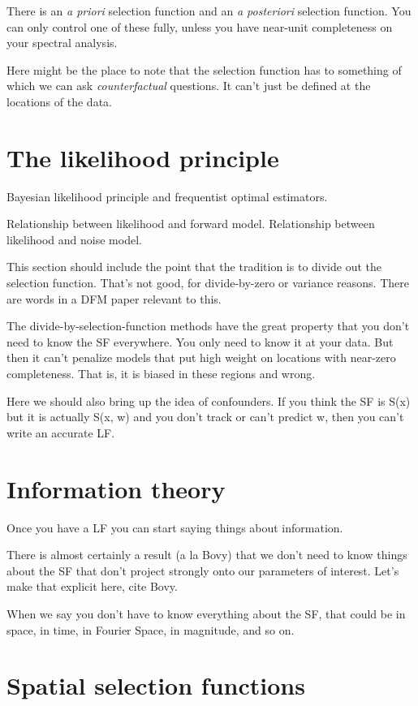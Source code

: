 \documentclass[modern]{aastex62}
\newcommand{\foreign}[1]{\textsl{#1}}
\begin{document}
There is an \foreign{a priori} selection function and an \foreign{a posteriori}
selection function. You can only control one of these fully, unless you have near-unit
completeness on your spectral analysis.

Here might be the place to note that the selection function has to something of
which we can ask \emph{counterfactual} questions. It can't just be defined at
the locations of the data.

\section{The likelihood principle}

Bayesian likelihood principle and frequentist optimal estimators.

Relationship between likelihood and forward model. Relationship between
likelihood and noise model.

This section should include the point that the tradition is to divide out
the selection function. That's not good, for divide-by-zero or variance
reasons. There are words in a DFM paper relevant to this.

The divide-by-selection-function methods have the great property that you don't need
to know the SF everywhere. You only need to know it at your data. But then
it can't penalize models that put high weight on locations with near-zero
completeness. That is, it is biased in these regions and wrong.

Here we should also bring up the idea of confounders. If you think the SF
is S(x) but it is actually S(x, w) and you don't track or can't predict w,
then you can't write an accurate LF.

\section{Information theory}

Once you have a LF you can start saying things about information.

There is almost certainly a result (a la Bovy) that we don't need to know
things about the SF that don't project strongly onto our parameters of interest.
Let's make that explicit here, cite Bovy.

When we say you don't have to know everything about the SF, that could be
in space, in time, in Fourier Space, in magnitude, and so on.

\section{Spatial selection functions}
\end{document}

